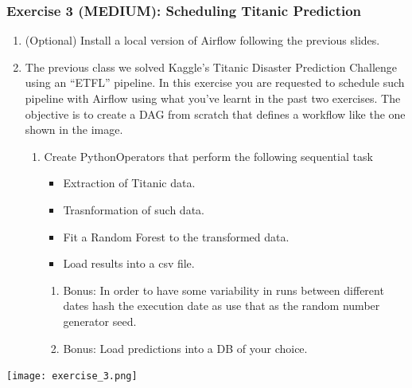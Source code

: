\documentclass[leqno, 10pt, envcountsect]{beamer}
\numberwithin{equation}{section}
\theoremstyle{definition}
\theoremstyle{example}
\numberwithin{figure}{section}
\numberwithin{table}{section}
\let\olditem\item
\renewcommand{\item}{%
\olditem\vspace{1pt}}
\begin{document}
\begin{frame}[fragile=singleslide]
  \frametitle{Exercise 3 (MEDIUM): Scheduling Titanic Prediction}
  \begin{enumerate}
    \item (Optional) Install a local version of Airflow following the previous
      slides.
    \item The previous class we solved Kaggle's Titanic Disaster Prediction
      Challenge using an \enquote{ETFL} pipeline. In this exercise you are
      requested to schedule such pipeline with Airflow using what you've learnt
      in the past two exercises. The objective is to create a DAG from scratch
      that defines a workflow like the one shown in the image.
    \begin{enumerate}
      \item Create PythonOperators that perform the following sequential task
        \begin{itemize}
          \item Extraction of Titanic data.
          \item Trasnformation of such data.
          \item Fit a Random Forest to the transformed data.
          \item Load results into a csv file.
        \end{itemize}
    \begin{enumerate}
          \item Bonus: In order to have some variability in runs between different
            dates hash the execution date as use that as the random number
            generator seed.
          \item Bonus: Load predictions into a DB of your choice.
        \end{enumerate}
      \end{enumerate}
      \end{enumerate}
  \begin{center}
    \texttt{[image: exercise\_3.png]}
  \end{center}
\end{frame}
\end{document}
